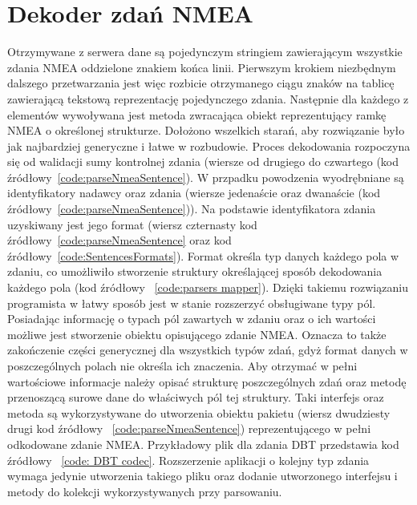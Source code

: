 \documentclass[skorowidz,skroty]{dyplomWEZUT}
\begin{document}
\section{Dekoder zdań NMEA}\label{sec: NMEA parser}
Otrzymywane z serwera dane są pojedynczym stringiem zawierającym wszystkie zdania NMEA oddzielone znakiem końca linii. Pierwszym krokiem niezbędnym dalszego przetwarzania jest więc rozbicie otrzymanego ciągu znaków na tablicę zawierającą tekstową reprezentację pojedynczego zdania. Następnie dla każdego z elementów wywoływana jest metoda zwracająca obiekt reprezentujący ramkę NMEA o określonej strukturze. Dołożono wszelkich starań, aby rozwiązanie było jak najbardziej generyczne i łatwe w rozbudowie. Proces dekodowania rozpoczyna się od walidacji sumy kontrolnej zdania (wiersze od drugiego do czwartego (kod źródłowy~\ref{code:parseNmeaSentence}). W przpadku powodzenia wyodrębniane są identyfikatory nadawcy oraz zdania (wiersze jedenaście oraz dwanaście (kod źródłowy~\ref{code:parseNmeaSentence})). Na podstawie identyfikatora zdania uzyskiwany jest jego format (wiersz czternasty kod źródłowy~\ref{code:parseNmeaSentence} oraz kod źródłowy~\ref{code:SentencesFormats}). Format określa typ danych każdego pola w zdaniu, co umożliwiło stworzenie struktury określającej sposób dekodowania każdego pola (kod źródłowy ~\ref{code:parsers mapper}). Dzięki takiemu rozwiązaniu programista w łatwy sposób jest w stanie rozszerzyć obsługiwane typy pól. Posiadając informację o typach pól zawartych w zdaniu oraz o ich wartości możliwe jest stworzenie obiektu opisującego zdanie NMEA. Oznacza to także zakończenie części generycznej dla wszystkich typów zdań, gdyż format danych w poszczególnych polach nie określa ich znaczenia. Aby otrzymać w pełni wartościowe informacje należy opisać strukturę poszczególnych zdań oraz metodę przenoszącą surowe dane do właściwych pól tej struktury. Taki interfejs oraz metoda są wykorzystywane do utworzenia obiektu pakietu (wiersz dwudziesty drugi kod źródłowy ~\ref{code:parseNmeaSentence}) reprezentującego w pełni odkodowane zdanie NMEA. Przykładowy plik dla zdania DBT przedstawia kod źródłowy ~\ref{code: DBT codec}. Rozszerzenie aplikacji o kolejny typ zdania wymaga jedynie utworzenia takiego pliku oraz dodanie utworzonego interfejsu i metody do kolekcji wykorzystywanych przy parsowaniu.
\end{document}
